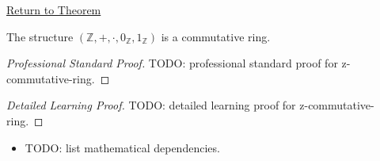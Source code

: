 \newpage
{}
\label{prf:z-commutative-ring}

\begin{remark*}[Return]
\hyperref[thm:z-commutative-ring]{Return to Theorem}
\end{remark*}

\begin{theorem*}
The structure $(\mathbb{Z},+,\cdot,0_{\mathbb{Z}},1_{\mathbb{Z}})$ is a
commutative ring.
\end{theorem*}

\begin{proof}[Professional Standard Proof]
\LRAProofBodyStart
TODO: professional standard proof for z-commutative-ring.
\end{proof}

\begin{proof}[Detailed Learning Proof]
\LRAProofBodyStart
TODO: detailed learning proof for z-commutative-ring.
\end{proof}

\begin{remark*}
\end{remark*}

\begin{dependencies}
\begin{itemize}
  \item TODO: list mathematical dependencies.
\end{itemize}
\end{dependencies}

\clearpage
